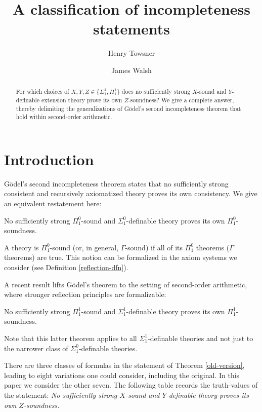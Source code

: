 \documentclass{amsart}
\title{A classification of incompleteness statements}
\author{Henry Towsner}
\author{James Walsh}
\theoremstyle{definition}
\theoremstyle{remark}
\begin{document}
\begin{abstract}
    For which choices of $X,Y,Z\in\{\Sigma^1_1,\Pi^1_1\}$ does no sufficiently strong $X$-sound and $Y$-definable extension theory prove its own $Z$-soundness? We give a complete answer, thereby delimiting the generalizations of G\"odel's second incompleteness theorem that hold within second-order arithmetic.
\end{abstract}

\maketitle

\section{Introduction}
G\"odel's second incompleteness theorem states that no sufficiently strong consistent and recursively axiomatized theory proves its own consistency. We give an equivalent restatement here:
\begin{theorem}[G\"odel]
    No sufficiently strong $\Pi^0_1$-sound and $\Sigma^0_1$-definable theory proves its own $\Pi^0_1$-soundness.
\end{theorem}
A theory is $\Pi^0_1$-sound (or, in general, $\Gamma$-sound) if all of its $\Pi^0_1$ theorems ($\Gamma$ theorems) are true. This notion can be formalized in the axiom systems we consider (see Definition \ref{reflection-dfn}).

A recent result \cite{walsh2021incompleteness} lifts G\"odel's theorem to the setting of second-order arithmetic, where stronger reflection principles are formalizable: 
\begin{theorem}[Walsh]\label{old-version}
No sufficiently strong $\Pi^1_1$-sound and $\Sigma^1_1$-definable theory proves its own $\Pi^1_1$-soundness.
\end{theorem}
Note that this latter theorem applies to all $\Sigma^1_1$-definable theories and not just to the narrower class of $\Sigma^0_1$-definable theories.

There are three classes of formulas in the statement of Theorem \ref{old-version}, leading to eight variations one could consider, including the original. In this paper we consider the other seven. The following table records the truth-values of the statement: \emph{No sufficiently strong $X$-sound and $Y$-definable theory proves its own $Z$-soundness.}
\end{document}
